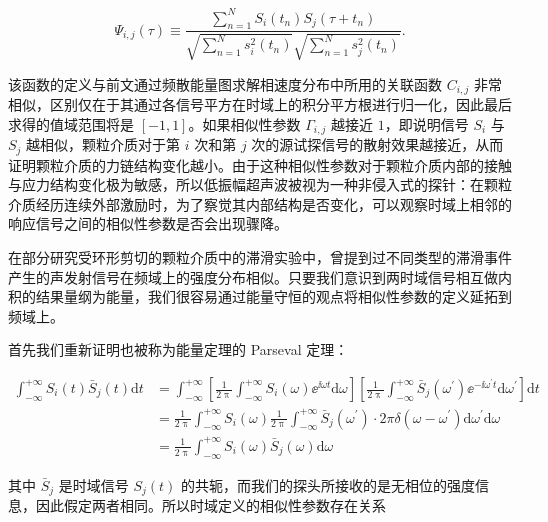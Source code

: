 \begin{equation}
  \Psi_{i,j}(\tau)\equiv \frac{\sum_{n=1}^{N}S_{i}(t_{n})S_{j}(\tau+t_{n})}{\sqrt{\sum_{n=1}^{N}s_{i}^{2}(t_{n})}\sqrt{\sum_{n=1}^{N}s_{j}^{2}(t_{n})}}.
\end{equation}

该函数的定义与前文通过频散能量图求解相速度分布中所用的关联函数 $C_{i,j}$ 非常相似，区别仅在于其通过各信号平方在时域上的积分平方根进行归一化，因此最后求得的值域范围将是 $[-1,1]$。如果相似性参数 $\Gamma_{i,j}$ 越接近 $1$，即说明信号 $S_{i}$ 与 $S_{j}$ 越相似，颗粒介质对于第 $i$ 次和第 $j$ 次的源试探信号的散射效果越接近，从而证明颗粒介质的力链结构变化越小。由于这种相似性参数对于颗粒介质内部的接触与应力结构变化极为敏感，所以低振幅超声波被视为一种非侵入式的探针：在颗粒介质经历连续外部激励时，为了察觉其内部结构是否变化，可以观察时域上相邻的响应信号之间的相似性参数是否会出现骤降。

在部分研究受环形剪切的颗粒介质中的滞滑实验中，曾提到过不同类型的滞滑事件产生的声发射信号在频域上的强度分布相似\cite{doi:10.1073/pnas.2305134120}。只要我们意识到两时域信号相互做内积的结果量纲为能量，我们很容易通过能量守恒的观点将相似性参数的定义延拓到频域上。

首先我们重新证明也被称为能量定理的 Parseval 定理：

\begin{equation}
  \begin{aligned}
    \int_{-\infty}^{+\infty}S_{i}(t)\bar{S}_{j}(t)\mathrm{d}t &= \int_{-\infty}^{+\infty}\left[\frac{1}{2\uppi}\int_{-\infty}^{+\infty}S_{i}(\omega){\ee}^{\ii \omega t}\mathrm{d}\omega\right]\left[\frac{1}{2\uppi}\int_{-\infty}^{+\infty}\bar{S}_{j}(\omega^{\prime}){\ee}^{-\ii \omega^{\prime}t}\mathrm{d}\omega^{\prime}\right]\mathrm{d}t\\
    &= \frac{1}{2\uppi}\int_{-\infty}^{+\infty}S_{i}(\omega)\frac{1}{2\uppi}\int_{-\infty}^{+\infty}\bar{S}_{j}(\omega^{\prime})\cdot 2\pi\delta(\omega-\omega^{\prime})\mathrm{d}\omega^{\prime}\mathrm{d}\omega\\
    &= \frac{1}{2\uppi}\int_{-\infty}^{+\infty}S_{i}(\omega)\bar{S}_{j}(\omega)\mathrm{d}\omega
  \end{aligned}
\end{equation}

其中 $\bar{S}_{j}$ 是时域信号 $S_{j}(t)$ 的共轭，而我们的探头所接收的是无相位的强度信息，因此假定两者相同。所以时域定义的相似性参数存在关系

